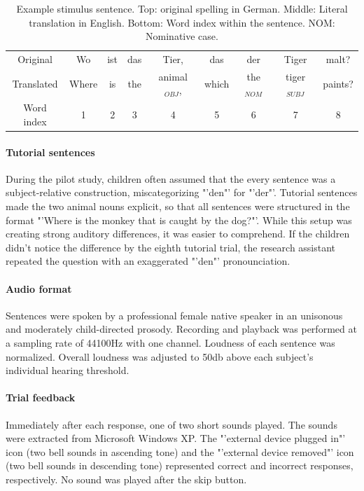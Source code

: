 \begin{table}[htb]
\vspace{5mm}
\begin{center}
\begin{tabular}{c|cccccccc}
Original & Wo & ist & das & Tier, & das & der & Tiger & malt?\\
Translated & Where & is & the & animal$_{OBJ}$, & which & the$_{NOM}$ & tiger$_{SUBJ}$ & paints?\\
Word index & 1 & 2 & 3 & 4 & 5 & 6 & 7 & 8
\end{tabular}
\caption{\label{3.1.sentences} Example stimulus sentence. Top: original spelling in German. Middle: Literal translation in English. Bottom: Word index within the sentence. NOM: Nominative case.}
\end{center}
\end{table}

\paragraph{Tutorial sentences}
During the pilot study, children often assumed that the every sentence was a subject-relative construction, miscategorizing "'den"' for "'der"'.
Tutorial sentences made the two animal nouns explicit, so that all sentences were structured in the format "'Where is the monkey that is caught by the dog?"'.
While this setup was creating strong auditory differences, it was easier to comprehend.
If the children didn't notice the difference by the eighth tutorial trial, the research assistant repeated the question with an exaggerated "'den"' pronounciation.

\paragraph{Audio format}
Sentences were spoken by a professional female native speaker in an uni\-so\-nous and moderately child-directed prosody.
Recording and playback was performed at a sampling rate of 44100Hz with one channel.
Loudness of each sentence was normalized.
Overall loudness was adjusted to 50db above each subject's individual hearing threshold.

\paragraph{Trial feedback}
Immediately after each response, one of two short sounds played.
The sounds were extracted from Microsoft Windows XP.
The "'external device plugged in"' icon (two bell sounds in ascending tone) and the "'external device removed"' icon (two bell sounds in descending tone) represented correct and incorrect responses, respectively.
No sound was played after the skip button.


